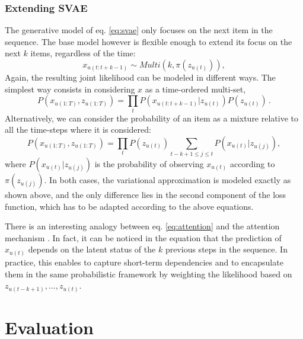 \documentclass[sigconf]{acmart}
\newcommand{\bs}[1]{\ensuremath{\bm{\mathit{#1}}}}
\numberwithin{equation}{section}
\begin{document}
\subsubsection{Extending SVAE}\label{sec:svae-ext}
The generative model of eq. \ref{eq:svae} only focuses on the
next item in the sequence. The base model however is flexible enough
to extend its focus on the next $k$ items, regardless of the time: 
$$
 \bs{x}_{u(t:t+k-1)} \sim \mathit{Multi}\left(k,\pi\left(\bs{z}_{u(t)}\right)\right),
$$
Again, the resulting joint likelihood can be modeled in different
ways. 
The simplest way consists in considering $\bs{x}$ as a time-ordered multi-set, 
\begin{equation}\label{eq:svae-ext-std}
  P(\bs{x}_{u(1:T)}, \bs{z}_{u(1:T)}) = \prod_t
  P(\bs{x}_{u(t:t+ k -1)} |\bs{z}_{u(t)})P(\bs{z}_{u(t)}) \, .
\end{equation}
Alternatively, we can consider the probability of an item as a mixture
relative to all the time-steps where it is considered:
\begin{equation}\label{eq:attention}
P(\bs{x}_{u(1:T)}, \bs{z}_{u(1:T)}) = \prod_t P(\bs{z}_{u(t)})
\sum_{t-k +1\leq j \leq t}P(\bs{x}_{u(t)} |\bs{z}_{u(j)}), 
\end{equation}
where $P(\bs{x}_{u(t)} |\bs{z}_{u(j)})$ is the probability of
observing $\bs{x}_{u(t)}$ according to $\pi(\bs{z}_{u(j)})$. 
In both cases, the variational approximation is modeled exactly as
shown above, and the only difference lies in the second component of
the loss function, which has to be adapted according to the above
equations.  



There is an interesting analogy between eq. \ref{eq:attention} and the
attention mechanism \cite{Vaswani:2017}. In fact, it can be noticed in
the equation that the prediction of $\bs{x}_{u(t)}$ depends on the
latent status of the $k$ previous steps in the sequence. In practice,
this enables to capture short-term dependencies and to encapsulate
them in the same probabilistic framework by weighting the likelihood
based on $\bs{z}_{u(t-k+1)}, \ldots, \bs{z}_{u(t)}$. 






\section{Evaluation}\label{sec:exp}
\end{document}
